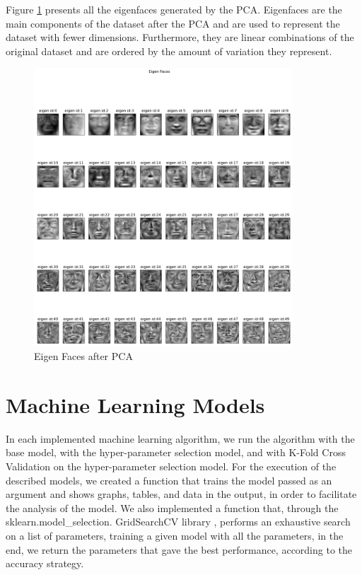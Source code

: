 \documentclass[conference]{IEEEtran}
\begin{document}
Figure \ref{img:eigen_faces.png} presents all the eigenfaces generated by the PCA. Eigenfaces are the main components of the dataset after the PCA and are used to represent the dataset with fewer dimensions. Furthermore, they are linear combinations of the original dataset and are ordered by the amount of variation they represent.

\begin{figure}[!h]
    \centering
    \includegraphics[width=3.8in]{cnn/output.png}
    \caption{Eigen Faces after PCA}
    \label{img:eigen_faces.png}
\end{figure}

\section{Machine Learning Models}

In each implemented machine learning algorithm, we run the algorithm with the base model, with the hyper-parameter selection model, and with K-Fold Cross Validation on the hyper-parameter selection model. For the execution of the described models, we created a function that trains the model passed as an argument and shows graphs, tables, and data in the output, in order to facilitate the analysis of the model.
We also implemented a function that, through the sklearn.model\_selection. GridSearchCV library \cite{grid-search-cV}, performs an exhaustive search on a list of parameters, training a given model with all the parameters, in the end, we return the parameters that gave the best performance, according to the accuracy strategy.
\end{document}
